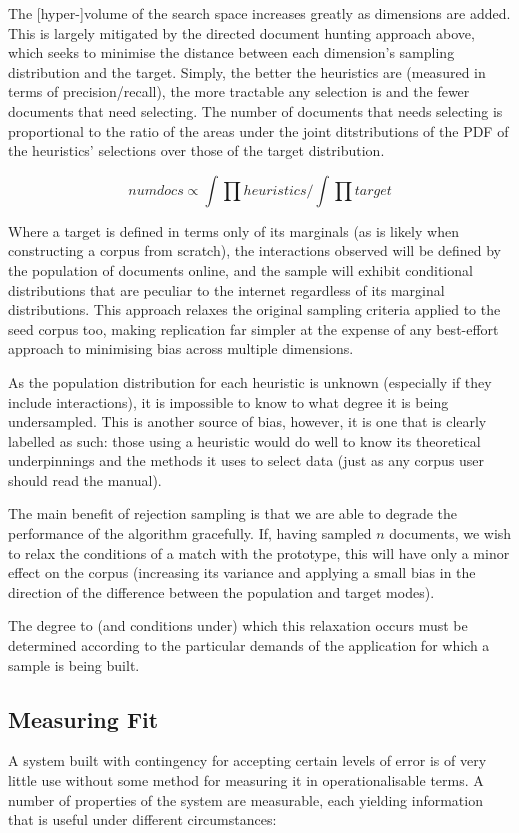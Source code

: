 The [hyper-]volume of the search space increases greatly as dimensions are added.  This is largely mitigated by the directed document hunting approach above, which seeks to minimise the distance between each dimension's sampling distribution and the target.  Simply, the better the heuristics are (measured in terms of precision/recall), the more tractable any selection is and the fewer documents that need selecting.  The number of documents that needs selecting is proportional to the ratio of the areas under the joint ditstributions of the PDF of the heuristics' selections over those of the target distribution.

$$
numdocs \propto \int{\prod{heuristics}} / \int{\prod{target}}
$$

Where a target is defined in terms only of its marginals (as is likely when constructing a corpus from scratch), the interactions observed will be defined by the population of documents online, and the sample will exhibit conditional distributions that are peculiar to the internet regardless of its marginal distributions.  This approach relaxes the original sampling criteria applied to the seed corpus too, making replication far simpler at the expense of any best-effort approach to minimising bias across multiple dimensions.

As the population distribution for each heuristic is unknown (especially if they include interactions), it is impossible to know to what degree it is being undersampled.  This is another source of bias, however, it is one that is clearly labelled as such: those using a heuristic would do well to know its theoretical underpinnings and the methods it uses to select data (just as any corpus user should read the manual).

The main benefit of rejection sampling is that we are able to degrade the performance of the algorithm gracefully.  If, having sampled $n$ documents, we wish to relax the conditions of a match with the prototype, this will have only a minor effect on the corpus (increasing its variance and applying a small bias in the direction of the difference between the population and target modes).  

The degree to (and conditions under) which this relaxation occurs must be determined according to the particular demands of the application for which a sample is being built.



\subsection{Measuring Fit}
A system built with contingency for accepting certain levels of error is of very little use without some method for measuring it in operationalisable terms. A number of properties of the system are measurable, each yielding information that is useful under different circumstances:


